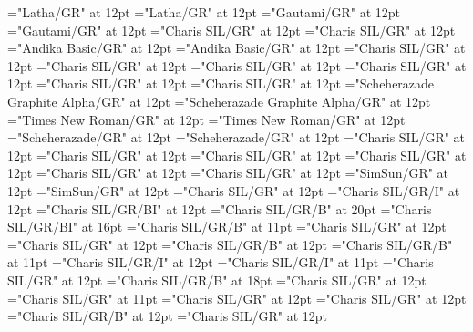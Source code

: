 \documentclass[a4paper,twoside]{article}
\begin{document}
\font\divta="Latha/GR" at 12pt
\font\spanta="Latha/GR" at 12pt
\font\divte="Gautami/GR" at 12pt
\font\spante="Gautami/GR" at 12pt
\font\divth="Charis SIL/GR" at 12pt
\font\spanth="Charis SIL/GR" at 12pt
\font\divtpi="Andika Basic/GR" at 12pt
\font\spantpi="Andika Basic/GR" at 12pt
\font\divtrfonipaxemic="Charis SIL/GR" at 12pt
\font\spantrfonipaxemic="Charis SIL/GR" at 12pt
\font\divtrfonipa="Charis SIL/GR" at 12pt
\font\spantrfonipa="Charis SIL/GR" at 12pt
\font\divtr="Charis SIL/GR" at 12pt
\font\spantr="Charis SIL/GR" at 12pt
\font\divurArab="Scheherazade Graphite Alpha/GR" at 12pt
\font\spanurArab="Scheherazade Graphite Alpha/GR" at 12pt
\font\divurxind="Times New Roman/GR" at 12pt
\font\spanurxind="Times New Roman/GR" at 12pt
\font\divur="Scheherazade/GR" at 12pt
\font\spanur="Scheherazade/GR" at 12pt
\font\divvi="Charis SIL/GR" at 12pt
\font\spanvi="Charis SIL/GR" at 12pt
\font\divxas="Charis SIL/GR" at 12pt
\font\spanxas="Charis SIL/GR" at 12pt
\font\divzhCNpinyin="Charis SIL/GR" at 12pt
\font\spanzhCNpinyin="Charis SIL/GR" at 12pt
\font\divzhCN="SimSun/GR" at 12pt
\font\spanzhCN="SimSun/GR" at 12pt
\font\scrBookscrBody="Charis SIL/GR" at 12pt
\font\scrBookNamezxxscrBookscrBody="Charis SIL/GR/I" at 12pt
\font\scrBookCodezxxscrBookscrBody="Charis SIL/GR/BI" at 12pt
\font\TitleMainscrBookscrBody="Charis SIL/GR/B" at 20pt
\font\TitleSecondaryzxxTitleMainscrBookscrBody="Charis SIL/GR/BI" at 16pt
\font\spanzxxTitleMainscrBookscrBody="Charis SIL/GR/B" at 11pt
\font\columnsscrBookscrBody="Charis SIL/GR" at 12pt
\font\scrSectioncolumnsscrBookscrBody="Charis SIL/GR" at 12pt
\font\SectionHeadscrSectioncolumnsscrBookscrBody="Charis SIL/GR/B" at 12pt
\font\spanzxxSectionHeadscrSectioncolumnsscrBookscrBody="Charis SIL/GR/B" at 11pt
\font\ParallelPassageReferencescrSectioncolumnsscrBookscrBody="Charis SIL/GR/I" at 12pt
\font\spanzxxParallelPassageReferencescrSectioncolumnsscrBookscrBody="Charis SIL/GR/I" at 11pt
\font\ParagraphscrSectioncolumnsscrBookscrBody="Charis SIL/GR" at 12pt
\font\ChapterNumberzxxParagraphscrSectioncolumnsscrBookscrBody="Charis SIL/GR/B" at 18pt
\font\VerseNumberzxxParagraphscrSectioncolumnsscrBookscrBody="Charis SIL/GR" at 12pt
\font\spanzxxParagraphscrSectioncolumnsscrBookscrBody="Charis SIL/GR" at 11pt
\font\scrFootnoteMarkerParagraphscrSectioncolumnsscrBookscrBody="Charis SIL/GR" at 12pt
\font\NoteGeneralParagraphParagraphscrSectioncolumnsscrBookscrBody="Charis SIL/GR" at 12pt
\font\NoteTargetReferencezxxNoteGeneralParagraphParagraphscrSectioncolumnsscrBookscrBody="Charis SIL/GR/B" at 12pt
\font\footnotequeryzxxNoteGeneralParagraphParagraphscrSectioncolumnsscrBookscrBody="Charis SIL/GR" at 12pt
\end{document}
